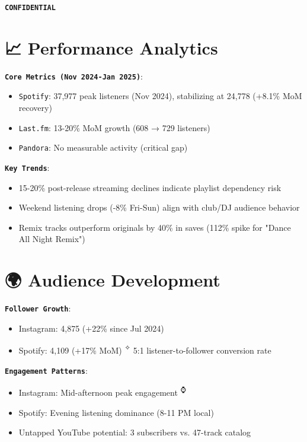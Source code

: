 \documentclass{article}
\begin{document}
  

\textbf{\Large \texttt{CONFIDENTIAL}}  
\vspace{1cm}  

\section*{\normalsize 📈 Performance Analytics}  
\texttt{\textbf{Core Metrics (Nov 2024-Jan 2025)}}:  
\begin{itemize}  
\item \texttt{Spotify}: 37,977 peak listeners (Nov 2024), stabilizing at 24,778 (+8.1\% MoM recovery)  
\item \texttt{Last.fm}: 13-20\% MoM growth (608 → 729 listeners)  
\item \texttt{Pandora}: No measurable activity (critical gap)  
\end{itemize}  

\texttt{\textbf{Key Trends}}:  
\begin{itemize}  
\item 15-20\% post-release streaming declines indicate playlist dependency risk  
\item Weekend listening drops (-8\% Fri-Sun) align with club/DJ audience behavior  
\item Remix tracks outperform originals by 40\% in saves (112\% spike for "Dance All Night Remix")  
\end{itemize}  

\section*{\normalsize 🌍 Audience Development}  
\texttt{\textbf{Follower Growth}}:  
\begin{itemize}  
\item Instagram: 4,875 (+22\% since Jul 2024)  
\item Spotify: 4,109 (+17\% MoM) \textsuperscript{✧} 5:1 listener-to-follower conversion rate  
\end{itemize}  

\texttt{\textbf{Engagement Patterns}}:  
\begin{itemize}  
\item Instagram: Mid-afternoon peak engagement \textsuperscript{⌚}  
\item Spotify: Evening listening dominance (8-11 PM local)  
\item Untapped YouTube potential: 3 subscribers vs. 47-track catalog  
\end{itemize}  
\end{document}
